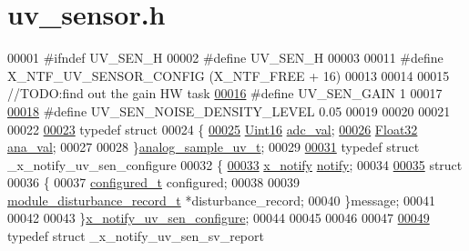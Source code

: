 \hypertarget{a00020_source}{\section{uv\+\_\+sensor.\+h}
\label{a00020_source}
}

\begin{DoxyCode}
00001 \textcolor{preprocessor}{#ifndef UV\_SEN\_H}
00002 \textcolor{preprocessor}{#define UV\_SEN\_H}
00003 
00011 \textcolor{preprocessor}{#define X\_NTF\_UV\_SENSOR\_CONFIG                                  (X\_NTF\_FREE + 16)}
00013 
00014 
00015 \textcolor{comment}{//TODO:find out the gain HW task}
\hypertarget{a00020_source_l00016}{}\hyperlink{a00020_a6ec94a6db817afee9f5fe1f0753d18bd}{00016} \textcolor{preprocessor}{#define UV\_SEN\_GAIN                                             1}
00017 
\hypertarget{a00020_source_l00018}{}\hyperlink{a00020_a6fe600e966b9b8a62c0121805f6cbc0d}{00018} \textcolor{preprocessor}{#define UV\_SEN\_NOISE\_DENSITY\_LEVEL                              0.05}
00019 
00020 
00021 
00022 
\hypertarget{a00020_source_l00023}{}\hyperlink{a00020}{00023} \textcolor{keyword}{typedef} \textcolor{keyword}{struct}
00024 \{
\hypertarget{a00020_source_l00025}{}\hyperlink{a00020_a891d4fcb12960785cecc1e688681b748}{00025}     \hyperlink{a00072_a59a9f6be4562c327cbfb4f7e8e18f08b}{Uint16}     \hyperlink{a00020_a891d4fcb12960785cecc1e688681b748}{adc\_val};
\hypertarget{a00020_source_l00026}{}\hyperlink{a00020_a053a8ae0e59f7414929cd8ac3feeec7b}{00026}     \hyperlink{a00072_a87d38f886e617ced2698fc55afa07637}{Float32}    \hyperlink{a00020_a053a8ae0e59f7414929cd8ac3feeec7b}{ana\_val};
00027 
00028 \}\hyperlink{a00020_dd/d6d/a00111}{analog\_sample\_uv\_t};
00029 
\hypertarget{a00020_source_l00031}{}\hyperlink{a00020}{00031} \textcolor{keyword}{typedef} \textcolor{keyword}{struct }\_x\_notify\_uv\_sen\_configure
00032 \{
\hypertarget{a00020_source_l00033}{}\hyperlink{a00020_a8e6a04c2283f9fd7b8dcbc62faba5847}{00033}     \hyperlink{a00036_df/d4c/a00851}{x\_notify}           \hyperlink{a00020_a8e6a04c2283f9fd7b8dcbc62faba5847}{notify};
00034 
\hypertarget{a00020_source_l00035}{}\hyperlink{a00020}{00035}     \textcolor{keyword}{struct}
00036     \{
00037        \hyperlink{a00021_d6/d9c/a00352}{configured\_t}  configured;
00038 
00039        \hyperlink{a00028}{module\_disturbance\_record\_t}   *disturbance\_record;
00040     \}message;
00041 
00042 
00043 \}\hyperlink{a00020_dd/db2/a00866}{x\_notify\_uv\_sen\_configure};
00044 
00045 
00046 
00047 
\hypertarget{a00020_source_l00049}{}\hyperlink{a00020}{00049} \textcolor{keyword}{typedef} \textcolor{keyword}{struct }\_x\_notify\_uv\_sen\_sv\_report

\end{DoxyCode}

